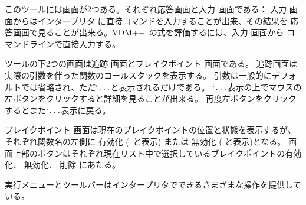 \documentclass[\pformat,12pt]{jarticle}
\newcommand{\vdmslpp}{VDM++}
\newcommand{\Lit}[1]{`#1\Quote}
\newcommand{\Sig}[1]{\Lit{{\tt #1}}}
\newcommand{\guicmd}[1]{{\gt #1}}
\begin{document}
このツールには画面が2つある。それぞれ\guicmd{応答}画面と\guicmd{入力} 画面である：
\guicmd{入力} 画面からは\guicmd{インタープリタ} に直接コマンドを入力することが出来、その結果を
\guicmd{応答}画面で見ることが出来る。\vdmslpp\ の式を評価するには、\guicmd{入力} 画面から
コマンドラインで直接入力する。

ツールの下2つの画面は\guicmd{追跡} 画面と\guicmd{ブレイクポイント} 画面である。
\guicmd{追跡}画面は実際の引数を伴った関数のコールスタックを表示する。
引数は一般的にデフォルトでは省略され、ただ\Sig{...}と表示されるだけである。
\Sig{...}表示の上でマウスの左ボタンをクリックすると詳細を見ることが出来る。
再度左ボタンをクリックするとまた\Sig{...}表示に戻る。


\guicmd{ブレイクポイント} 画面は現在のブレイクポイントの位置と状態を表示するが、それぞれ関数名の左側に
\guicmd{有効化} (\raisebox{0.5mm}{{\fbox{\tt\tiny
      $\surd$}}}\ と表示) または
\guicmd{無効化} (
\raisebox{1mm}{{\fbox{\rule[-0.75mm]{0mm}{1.5mm}{\hspace*{1.5mm}}}}}と表示)となる。
画面上部のボタンはそれぞれ現在リスト中で選択しているブレイクポイントの有効化、
無効化、
削除 にあたる。

\guicmd{実行}メニューとツールバーはインタープリタでできるさまざまな操作を提供している。
\end{document}
